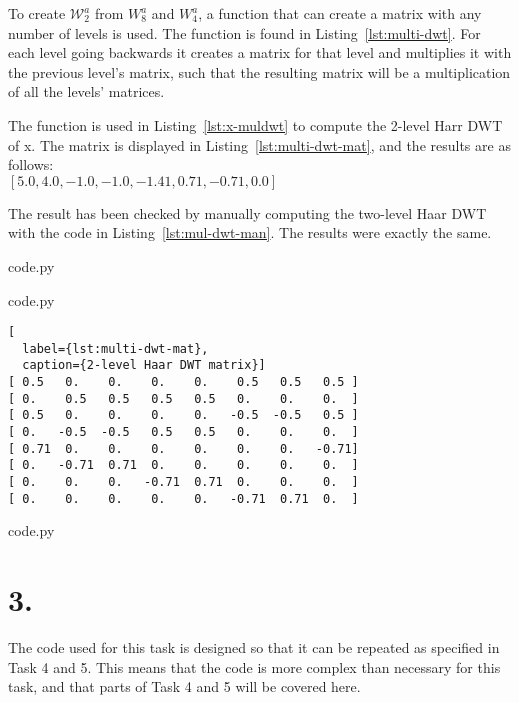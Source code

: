To create \(\mathcal{W}^a_2\) from \(W^a_8\) and \(W^a_4\), a function that can create a matrix with any number of levels is used.
The function is found in Listing~\ref{lst:multi-dwt}.
For each level going backwards it creates a matrix for that level and multiplies it with the previous level's matrix, such that the resulting matrix will be a multiplication of all the levels' matrices.

The function is used in Listing~\ref{lst:x-muldwt} to compute the 2-level Harr DWT of x.
The matrix is displayed in Listing~\ref{lst:multi-dwt-mat}, and the results are as follows:\\
\([5.0, 4.0, -1.0, -1.0, -1.41, 0.71, -0.71, 0.0]\)

The result has been checked by manually computing the two-level Haar DWT with the code in Listing~\ref{lst:mul-dwt-man}.
The results were exactly the same.


  {code.py}


  {code.py}

\begin{lstlisting}[
  label={lst:multi-dwt-mat},
  caption={2-level Haar DWT matrix}]
[ 0.5   0.    0.    0.    0.    0.5   0.5   0.5 ]
[ 0.    0.5   0.5   0.5   0.5   0.    0.    0.  ]
[ 0.5   0.    0.    0.    0.   -0.5  -0.5   0.5 ]
[ 0.   -0.5  -0.5   0.5   0.5   0.    0.    0.  ]
[ 0.71  0.    0.    0.    0.    0.    0.   -0.71]
[ 0.   -0.71  0.71  0.    0.    0.    0.    0.  ]
[ 0.    0.    0.   -0.71  0.71  0.    0.    0.  ]
[ 0.    0.    0.    0.    0.   -0.71  0.71  0.  ]
\end{lstlisting}


  {code.py}

\section*{3.}

The code used for this task is designed so that it can be repeated as specified in Task 4 and 5.
This means that the code is more complex than necessary for this task, and that parts of Task 4 and 5 will be covered here.

